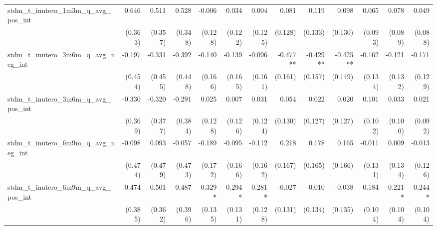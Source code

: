 \begin{tabular}{lrrrrrrrrrrrr}
stdm\_t\_inutero\_1m3m\_q\_avg\_pos\_int    &        0.646 &        0.511 &        0.528 &       -0.006 &        0.034 &        0.004 &        0.081 &        0.119 &        0.098 &        0.065 &        0.078 &        0.049 \\ 
                                            &      (0.363) &      (0.357) &      (0.348) &      (0.128) &      (0.122) &      (0.125) &      (0.128) &      (0.133) &      (0.130) &      (0.093) &      (0.089) &      (0.088) \\ 
stdm\_t\_inutero\_3m6m\_q\_avg\_neg\_int    &       -0.197 &       -0.331 &       -0.392 &       -0.140 &       -0.139 &       -0.096 &     -0.477** &     -0.429** &     -0.425** &       -0.162 &       -0.121 &       -0.171 \\ 
                                            &      (0.454) &      (0.455) &      (0.448) &      (0.166) &      (0.165) &      (0.161) &      (0.161) &      (0.157) &      (0.149) &      (0.134) &      (0.132) &      (0.129) \\ 
stdm\_t\_inutero\_3m6m\_q\_avg\_pos\_int    &       -0.330 &       -0.320 &       -0.291 &        0.025 &        0.007 &        0.031 &        0.054 &        0.022 &        0.020 &        0.101 &        0.033 &        0.021 \\ 
                                            &      (0.369) &      (0.377) &      (0.384) &      (0.128) &      (0.126) &      (0.124) &      (0.130) &      (0.127) &      (0.127) &      (0.102) &      (0.100) &      (0.092) \\ 
stdm\_t\_inutero\_6m9m\_q\_avg\_neg\_int    &       -0.098 &        0.093 &       -0.057 &       -0.189 &       -0.095 &       -0.112 &        0.218 &        0.178 &        0.165 &       -0.011 &        0.009 &       -0.013 \\ 
                                            &      (0.474) &      (0.479) &      (0.473) &      (0.172) &      (0.166) &      (0.162) &      (0.167) &      (0.165) &      (0.166) &      (0.131) &      (0.134) &      (0.126) \\ 
stdm\_t\_inutero\_6m9m\_q\_avg\_pos\_int    &        0.474 &        0.501 &        0.487 &       0.329* &       0.294* &       0.281* &       -0.027 &       -0.010 &       -0.038 &        0.184 &       0.221* &       0.244* \\ 
                                            &      (0.385) &      (0.362) &      (0.396) &      (0.135) &      (0.131) &      (0.128) &      (0.131) &      (0.134) &      (0.135) &      (0.104) &      (0.104) &      (0.104) \\ 

\end{tabular}

